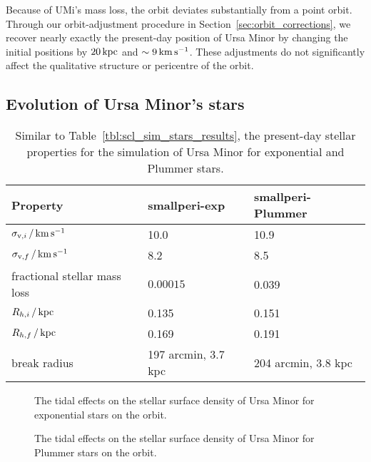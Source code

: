 Because of UMi's mass loss, the orbit deviates substantially from a
point orbit. Through our orbit-adjustment procedure in
Section~\ref{sec:orbit_corrections}, we recover nearly exactly the
present-day position of Ursa Minor by changing the initial positions by
\(20\,{\rm kpc}\) and \(\sim 9\,{\rm km\,s^{-1}}\). These adjustments do not
significantly affect the qualitative structure or pericentre of the
orbit.

\subsection{Evolution of Ursa Minor's
stars}\label{evolution-of-ursa-minors-stars}

\begin{table*}[t]
\centering
\caption[Simulation results for Ursa Minor’s stars]{Similar to Table \ref{tbl:scl_sim_stars_results}, the present-day stellar properties for the simulation of Ursa Minor for exponential and Plummer stars. }
\label{tbl:umi_sim_stars_results}
\begin{tabular}{lll}
\toprule
Property & smallperi-exp & smallperi-Plummer\\
\midrule
$\sigma_{{\rm v}, i}\,/\,{\rm km\,s^{-1}}$ & 10.0 & 10.9\\
$\sigma_{{\rm v}, f}\,/\,{\rm km\,s^{-1}}$ & 8.2 & 8.5\\
fractional stellar mass loss & $0.00015$ & 0.039\\
$R_{h, i}\,/\,{\rm kpc}$ & 0.135 & 0.151\\
$R_{h, f}\,/\,{\rm kpc}$ & 0.169 & 0.191\\
break radius & 197 arcmin, 3.7 kpc & 204 arcmin, 3.8 kpc\\
\bottomrule
\end{tabular}
\end{table*}

\begin{figure}
\centering
{}
\caption[Ursa Minor simulated density profiles]{The tidal effects on the
stellar surface density of Ursa Minor for exponential stars on the
\smallperi{} orbit.}\label{fig:umi_smallperi_i_f}
\end{figure}

\begin{figure}
\centering
{}
\caption[Ursa Minor Plummer model density]{The tidal effects on the
stellar surface density of Ursa Minor for Plummer stars on the
\smallperi{} orbit.}\label{fig:umi_plummer_i_f}
\end{figure}

